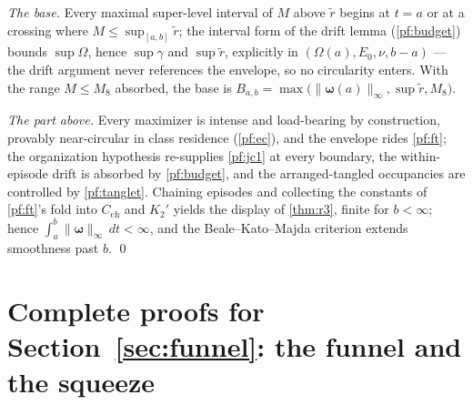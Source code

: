 \documentclass[11pt,letterpaper]{amsart}
\theoremstyle{definition}
\theoremstyle{remark}
\newcommand{\vort}{\boldsymbol{\omega}}
\newcommand{\norm}[1]{\lVert #1 \rVert}
\begin{document}
\emph{The base.} Every maximal super-level interval of $M$ above $\tilde r$ begins
at $t=a$ or at a crossing where $M\le\sup_{[a,b]}\tilde r$; the interval form of
the drift lemma (\cref{pf:budget}) bounds $\sup\Omega$, hence $\sup\gamma$ and
$\sup\tilde r$, explicitly in $(\Omega(a),E_0,\nu,b-a)$ --- the drift argument
never references the envelope, so no circularity enters. With the range $M\le M_8$
absorbed, the base is
$B_{a,b}=\max\bigl(\norm{\vort(a)}_\infty,\sup\tilde r,M_8\bigr)$.

\emph{The part above.} Every maximizer is intense and load-bearing by construction,
provably near-circular in class residence (\cref{pf:ec}), and the envelope rides
\cref{pf:ft}; the organization hypothesis re-supplies \cref{pf:jc1} at every
boundary, the within-episode drift is absorbed by \cref{pf:budget}, and the
arranged-tangled occupancies are controlled by \cref{pf:tanglet}. Chaining episodes
and collecting the constants of \cref{pf:ft}'s fold into $C_{\mathrm{ch}}$ and
$K_2'$ yields the display of \cref{thm:r3}, finite for $b<\infty$; hence
$\int_a^b\norm{\vort}_\infty\,dt<\infty$, and the Beale--Kato--Majda criterion
\cite{BealeKatoMajda1984} extends smoothness past $b$. \qed

\section{Complete proofs for Section~\ref{sec:funnel}: the funnel and the squeeze}\label{pfsec:funnel}
\end{document}
